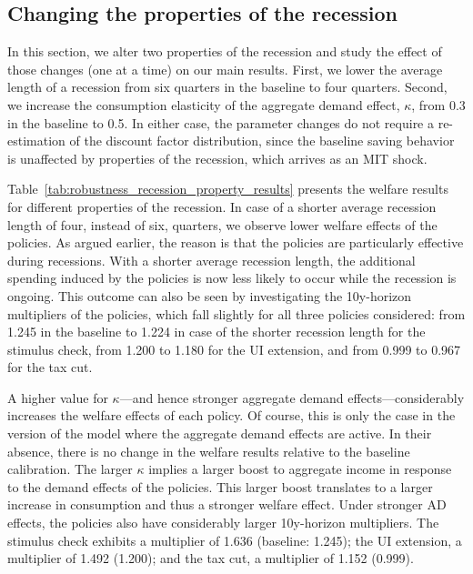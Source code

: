 \documentclass[\latexroot/\projectname]{subfiles}
\begin{document}
\FloatBarrier
\hypertarget{changing-the-properties-of-the-recession}{}\par\subsection*{Changing the properties of the recession}

In this section, we alter two properties of the recession and study the effect of those changes (one at a time) on our main results.
First, we lower the average length of a recession from six quarters in the baseline to four quarters.
Second, we increase the consumption elasticity of the aggregate demand effect, $\kappa$, from 0.3 in the baseline to 0.5.
In either case, the parameter changes do not require a re-estimation of the discount factor distribution, since the baseline saving behavior is unaffected by properties of the recession, which arrives as an MIT shock.

Table~\ref{tab:robustness_recession_property_results} presents the welfare results for different properties of the recession.
In case of a shorter average recession length of four, instead of six, quarters, we observe lower welfare effects of the policies.
As argued earlier, the reason is that the policies are particularly effective during recessions.
With a shorter average recession length, the additional spending induced by the policies is now less likely to occur while the recession is ongoing.
This outcome can also be seen by investigating the 10y-horizon multipliers of the policies, which fall slightly for all three policies considered: from 1.245 in the baseline to 1.224 in case of the shorter recession length for the stimulus check, from 1.200 to 1.180 for the UI extension, and from 0.999 to 0.967 for the tax cut.

A higher value for $\kappa$---and hence stronger aggregate demand effects---considerably increases the welfare effects of each policy.
Of course, this is only the case in the version of the model where the aggregate demand effects are active.
In their absence, there is no change in the welfare results relative to the baseline calibration.
The larger $\kappa$ implies a larger boost to aggregate income in response to the demand effects of the policies.
This larger boost translates to a larger increase in consumption and thus a stronger welfare effect.
Under stronger AD effects, the policies also have considerably larger 10y-horizon multipliers.
The stimulus check exhibits a multiplier of 1.636 (baseline: 1.245); the UI extension, a multiplier of 1.492 (1.200); and the tax cut, a multiplier of 1.152 (0.999).
\end{document}
